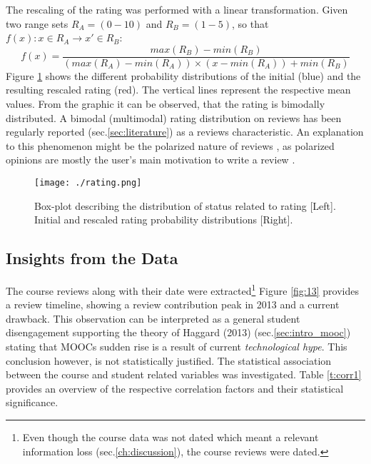 \documentclass[
	a4paper,
	pdftex,
	12pt,	
	footinclude=true,
	fleqn,
	final,
	]{report}%
\begin{document}
The rescaling of the rating was performed with a linear transformation. Given
two range sets $R_{A}=(0-10)$ and $R_{B}=(1-5)$, so that $f(x): x \in R_{A} \rightarrow x' \in R_{B}$:
\begin{equation}
  f(x) = \dfrac{max(R_{B}) - min(R_{B})}{(max(R_{A}) - min(R_{A})) \times (x - min(R_{A})) + min(R_{B})}
\end{equation}
Figure \ref{fig:22} shows the different probability distributions of the initial (blue) and the resulting
rescaled rating (red). The vertical lines represent the respective mean values. 
From the graphic it can be observed, that the rating is bimodally distributed. 
A bimodal (multimodal) rating distribution on reviews has 
been regularly reported \cite{Lackermair2013} (sec.\ref{sec:literature}) as a reviews characteristic.
An explanation to this phenomenon might be the polarized nature of reviews \cite{Liu2012a},
as polarized opinions are mostly the user's main motivation to write a review \cite{Pang2002}.
\begin{figure}[h]
 \centering
 \texttt{[image: ./rating.png]}
 \caption[Rating Statistical Characteristics]{Box-plot describing the distribution of status related to rating [Left]. Initial and rescaled rating probability distributions [Right].}
 \label{fig:22}
\end{figure}

\vspace{-0.45cm}
\subsection{Insights from the Data}
\label{sec:correlation}
\vspace{-0.3cm}
The course reviews along with their date were extracted\footnote{Even though the course data was not dated 
which meant a relevant information loss (sec.\ref{ch:discussion}), the course reviews were dated.} 
Figure \ref{fig:13} provides a review timeline, showing a review contribution peak in 2013 and a 
current drawback. This observation can be interpreted as a general student disengagement 
supporting the theory of Haggard (2013) (sec.\ref{sec:intro_mooc}) 
stating that MOOCs sudden rise is a result of current \emph{technological hype}. 
This conclusion however, is not statistically justified. The statistical 
association between the course and student related variables 
was investigated. Table \ref{t:corr1} provides an overview of the 
respective correlation factors and their statistical 
significance. 
\end{document}
